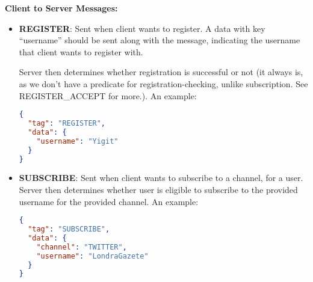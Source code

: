 \documentclass{article}
\begin{document}
\textbf{Client to Server Messages:}
\begin{itemize}
  \item \textbf{REGISTER}: Sent when client wants to register. A data with key ``username'' should be sent along with the message, indicating the username that client wants to register with.
    \par Server then determines whether registration is successful or not (it always is, as we don't have a predicate for registration-checking, unlike subscription. See REGISTER\_ACCEPT for more.). An example:
\begin{lstlisting}[language=json]
{
  "tag": "REGISTER",
  "data": {
    "username": "Yigit"
  }
}
\end{lstlisting}
  \item \textbf{SUBSCRIBE}: Sent when client wants to subscribe to a channel, for a user. Server then determines whether user is eligible to subscribe to the provided username for the provided channel. An example:
\begin{lstlisting}[language=json]
{
  "tag": "SUBSCRIBE",
  "data": {
    "channel": "TWITTER",
    "username": "LondraGazete"
  }
}
\end{lstlisting}
\end{itemize}
\end{document}
